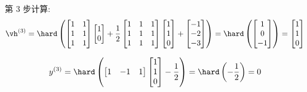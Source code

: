 \documentclass[openany]{ctexbook}
\theoremstyle{kaiti}
\theoremstyle{normal}
\begin{document}
第 3 步计算:
\begin{equation}
  \vh^{(3)}
  =\hard\left(
    \begin{bmatrix}
      1 & 1 \\
      1 & 1 \\
      1 & 1 \\
    \end{bmatrix}
    \begin{bmatrix}
      1 \\ 0 \\
    \end{bmatrix}
    +\frac{1}{2}
    \begin{bmatrix}
      1 & 1 & 1 \\
      1 & 1 & 1 \\
      1 & 1 & 1 \\
    \end{bmatrix}
    \begin{bmatrix}
      1 \\ 1 \\ 0 \\
    \end{bmatrix}
    +
    \begin{bmatrix}
      -1 \\ -2 \\ -3 \\
    \end{bmatrix}
  \right)
  =\hard\left(
    \begin{bmatrix}
      1 \\ 0 \\ -1 \\
    \end{bmatrix}
  \right)
  =
  \begin{bmatrix}
    1 \\ 1 \\ 0 \\
  \end{bmatrix}
\end{equation}

\begin{equation}
  y^{(3)}
  =\hard\left(
    \begin{bmatrix}
      1 & -1 & 1 \\
    \end{bmatrix}
    \begin{bmatrix}
      1 \\ 1 \\ 0 \\
    \end{bmatrix}
    -\frac{1}{2}
  \right)
  =\hard\left(
    -\frac{1}{2}
  \right)
  =0
\end{equation}
\end{document}

